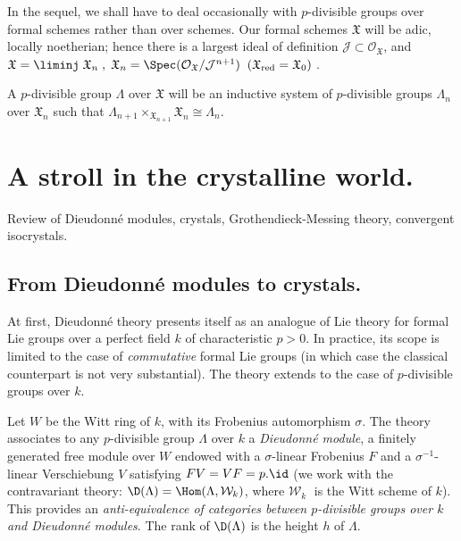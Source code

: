 \begin{para}\label{para:2.2.5} In the sequel, we shall have to deal
 occasionally with $p$-divisible groups over formal schemes rather 
than over schemes. Our formal schemes $\mathfrak{X}$ will be adic,
locally noetherian; hence there is a largest ideal of definition
$\mathcal{J}\subset \mathcal{O}_{\mathfrak{X}}$, and
$\mathfrak{X}=\liminj \;{\mathfrak{X}}_n\;,\;{\mathfrak{X}}_n =
\Spec(\mathcal{O}_{\mathfrak{X}}/\mathcal{J}^{n+1})\;\;
({\mathfrak{X}}_{\mathrm{red}}={\mathfrak{X}}_0)\;$.

A $p$-divisible group $\Lambda$ over $\mathfrak{X}$ will be an inductive
system of $p$-divisible groups $\Lambda_n$ over $\mathfrak{X}_n$ such
that $\Lambda_{n+1}\times_{{\mathfrak{X}}_{n+1}}{\mathfrak{X}}_n\cong
\Lambda_n$.

\newpage
\section{A stroll in the crystalline world.}\label{sec:3}

\begin{abst}
 Review of Dieudonn\'e modules, crystals, Grothendieck-Messing theory,
 convergent isocrystals.
\end{abst}
\end{para}

\subsection{From Dieudonn\'e modules to crystals.}\label{sub:3.1}

\begin{para}\label{para:3.1.1}
 At first, Dieudonn\'e theory presents itself as an analogue of Lie
 theory for formal Lie groups over a perfect field $k$ of characteristic
 $p>0$. In practice, its scope is limited to the case of {\it
 commutative} formal Lie groups (in which case the classical counterpart
 is not very substantial). The theory extends to the case of
 $p$-divisible groups over $k$.


 Let $W$ be the Witt ring of $k$, with its Frobenius automorphism
 $\sigma$. The theory associates to any 
 $p$-divisible group $\Lambda$ over $k$ a {\it Dieudonn\'e module}, \ie a
 finitely generated free module over $W$ 
 endowed with a $\sigma$-linear Frobenius $F$ and a $\sigma^{-1}$-linear
 Verschiebung 
 $V$ satisfying $FV=VF=p.\id$ (we work with the contravariant theory: 
 ${\D}(\Lambda)=\Hom(\Lambda , \mathcal{W}_k)$, 
 where $\mathcal{W}_k\;$
 is the Witt scheme of $k$). This provides an 
 {\it anti-equivalence of categories between $p$-divisible groups over
 $k$ and Dieudonn\'e modules}. The rank of 
 ${\D}(\Lambda)$ is the height $h$ of $\Lambda$. 
\end{para}


